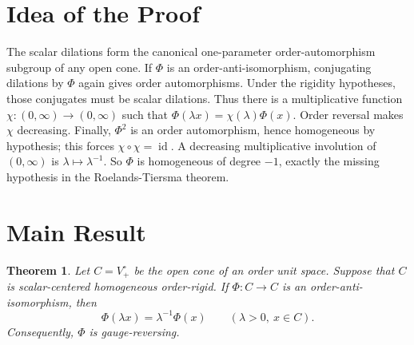\documentclass[11pt]{article}
\newtheorem{theorem}{Theorem}
\begin{document}
\section*{Idea of the Proof}

The scalar dilations form the canonical one-parameter order-automorphism
subgroup of any open cone. If \(\Phi\) is an order-anti-isomorphism, conjugating
dilations by \(\Phi\) again gives order automorphisms. Under the rigidity
hypotheses, those conjugates must be scalar dilations. Thus there is a
multiplicative function \(\chi:(0,\infty)\to(0,\infty)\) such that
\(\Phi(\lambda x)=\chi(\lambda)\Phi(x)\). Order reversal makes \(\chi\)
decreasing. Finally, \(\Phi^2\) is an order automorphism, hence homogeneous by
hypothesis; this forces \(\chi\circ\chi=\operatorname{id}\). A decreasing
multiplicative involution of \((0,\infty)\) is \(\lambda\mapsto\lambda^{-1}\).
So \(\Phi\) is homogeneous of degree \(-1\), exactly the missing hypothesis in
the Roelands-Tiersma theorem.

\section*{Main Result}

\begin{theorem}
Let \(C=V_+^\circ\) be the open cone of an order unit space. Suppose that \(C\)
is scalar-centered homogeneous order-rigid. If
\(\Phi:C\to C\) is an order-anti-isomorphism, then
\[
  \Phi(\lambda x)=\lambda^{-1}\Phi(x)
  \qquad(\lambda>0,\ x\in C).
\]
Consequently, \(\Phi\) is gauge-reversing.
\end{theorem}
\end{document}
